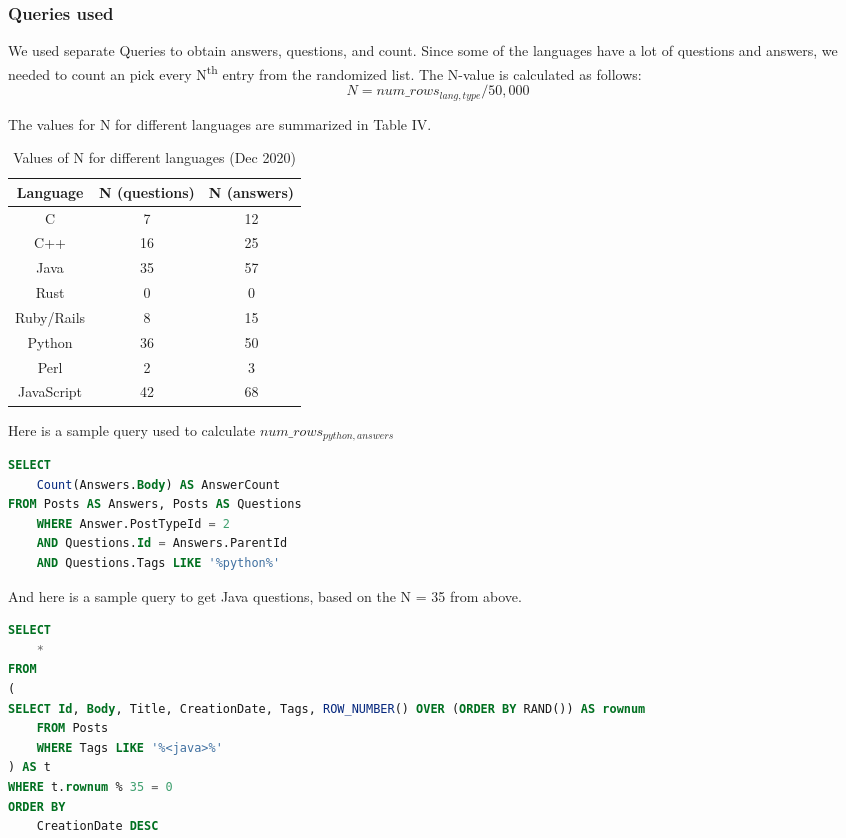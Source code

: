 \documentclass[conference]{IEEEtran}
\begin{document}
\subsubsection{Queries used}
We used separate Queries to obtain answers, questions, and count. Since some of the languages have a lot of questions and answers, we needed to count an pick every N\textsuperscript{th} entry from the randomized list. The N-value is calculated as follows:
\begin{equation}
    N = num\_rows_{lang, type} / 50,000
\end{equation}

The values for N for different languages are summarized in Table IV.
\begin{table}[htbp]
\caption{Values of N for different languages (Dec 2020)}
\begin{center}
\begin{tabular}{|c|c|c|}
\hline
\textbf{Language}&\textbf{N (questions)}& \textbf{N (answers)}\\
\hline
C&7&12\\
\hline
C++&16&25\\
\hline
Java&35&57\\
\hline
Rust&0&0\\
\hline
Ruby/Rails&8&15\\
\hline
Python&36&50\\
\hline
Perl&2&3\\
\hline
JavaScript&42&68\\
\hline
\end{tabular}
\label{tab1}
\end{center}
\end{table}

Here is a sample query used to calculate $num\_rows_{python, answers}$\\

\begin{lstlisting}[language=SQL]
SELECT
    Count(Answers.Body) AS AnswerCount
FROM Posts AS Answers, Posts AS Questions
    WHERE Answer.PostTypeId = 2
    AND Questions.Id = Answers.ParentId
    AND Questions.Tags LIKE '%python%'
\end{lstlisting}

And here is a sample query to get Java questions, based on the N = 35 from above.
\begin{lstlisting}[language=SQL]
SELECT
    *
FROM
(
SELECT Id, Body, Title, CreationDate, Tags, ROW_NUMBER() OVER (ORDER BY RAND()) AS rownum
    FROM Posts
    WHERE Tags LIKE '%<java>%'
) AS t
WHERE t.rownum % 35 = 0
ORDER BY
    CreationDate DESC
\end{lstlisting}
\end{document}
